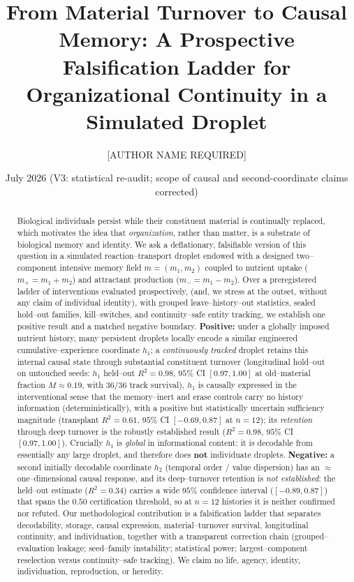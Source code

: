 \documentclass[11pt]{article}
\title{\textbf{From Material Turnover to Causal Memory: A Prospective Falsification Ladder for Organizational Continuity in a Simulated Droplet}}
\author[1]{[AUTHOR NAME REQUIRED]}
\affil[1]{[AFFILIATION REQUIRED] \quad ORCID: [ORCID IF AVAILABLE]}
\date{July 2026 \quad (V3: statistical re-audit; scope of causal and second-coordinate claims corrected)}
\begin{document}
\maketitle

\begin{abstract}
\noindent Biological individuals persist while their constituent material is continually replaced, which motivates
the idea that \emph{organization}, rather than matter, is a substrate of biological memory and identity. We ask a
deflationary, falsifiable version of this question in a simulated reaction--transport droplet endowed with a designed
two--component intensive memory field $m=(m_1,m_2)$ coupled to nutrient uptake ($m_+=m_1+m_2$) and attractant
production ($m_-=m_1-m_2$). Over a preregistered ladder of interventions evaluated prospectively, (and, we stress at the outset, without any claim of individual identity), with grouped
leave--history--out statistics, sealed hold--out families, kill--switches, and continuity--safe entity tracking, we
establish one positive result and a matched negative boundary. \textbf{Positive:} under a globally imposed nutrient
history, many persistent droplets locally encode a similar engineered cumulative--experience coordinate $h_1$; a
\emph{continuously tracked} droplet retains this internal causal state through substantial constituent turnover
(longitudinal hold--out on untouched seeds: $h_1$ held--out $R^2=0.98$, $95\%$ CI $[0.97,1.00]$ at old--material
fraction $M\approx0.19$, with $36/36$ track survival), $h_1$ is causally expressed in the interventional sense that the memory--inert and erase controls carry no history information (deterministically), with a positive but statistically uncertain sufficiency magnitude (transplant $R^2=0.61$, $95\%$ CI $[-0.69,0.87]$ at $n=12$); its \emph{retention} through deep turnover is the robustly established result ($R^2=0.98$, $95\%$ CI $[0.97,1.00]$).
Crucially $h_1$ is \emph{global} in informational content: it is decodable from essentially any large droplet, and
therefore does \textbf{not} individuate droplets. \textbf{Negative:} a second initially decodable coordinate $h_2$ (temporal order / value dispersion) has an $\approx$one--dimensional causal response, and its deep--turnover retention is \emph{not established}: the held--out estimate ($R^2=0.34$) carries a wide $95\%$ confidence interval ($[-0.89,0.87]$) that spans the $0.50$ certification threshold, so at $n=12$ histories it is neither confirmed nor refuted. Our methodological contribution is a
falsification ladder that separates decodability, storage, causal expression, material--turnover survival,
longitudinal continuity, and individuation, together with a transparent correction chain (grouped--evaluation
leakage; seed--family instability; statistical power; largest--component reselection versus continuity--safe
tracking). We claim no life, agency, identity, individuation, reproduction, or heredity.
\end{abstract}
\end{document}

